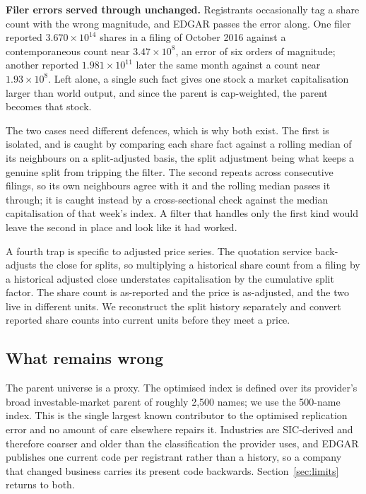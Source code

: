 \textbf{Filer errors served through unchanged.} Registrants occasionally tag a
share count with the wrong magnitude, and EDGAR passes the error along. One
filer reported $3.670\times10^{14}$ shares in a filing of October 2016 against
a contemporaneous count near $3.47\times10^{8}$, an error of six orders of
magnitude; another reported $1.981\times10^{11}$ later the same month against
a count near $1.93\times10^{8}$. Left alone, a single such fact gives one stock
a market capitalisation larger than world output, and since the parent is
cap-weighted, the parent becomes that stock.

The two cases need different defences, which is why both exist. The first is
isolated, and is caught by comparing each share fact against a rolling median
of its neighbours on a split-adjusted basis, the split adjustment being what
keeps a genuine split from tripping the filter. The second repeats across
consecutive filings, so its own neighbours agree with it and the rolling median
passes it through; it is caught instead by a cross-sectional check against the
median capitalisation of that week's index. A filter that handles only the
first kind would leave the second in place and look like it had worked.

A fourth trap is specific to adjusted price series. The quotation service
back-adjusts the close for splits, so multiplying a historical share count from
a filing by a historical adjusted close understates capitalisation by the
cumulative split factor. The share count is as-reported and the price is
as-adjusted, and the two live in different units. We reconstruct the split
history separately and convert reported share counts into current units before
they meet a price.

\subsection{What remains wrong}
The parent universe is a proxy. The optimised index is defined over its
provider's broad investable-market parent of roughly 2{,}500 names; we use the
500-name index. This is the single largest known contributor to the optimised
replication error and no amount of care elsewhere repairs it. Industries are
SIC-derived and therefore coarser and older than the classification the
provider uses, and EDGAR publishes one current code per registrant rather than
a history, so a company that changed business carries its present code
backwards. Section~\ref{sec:limits} returns to both.
